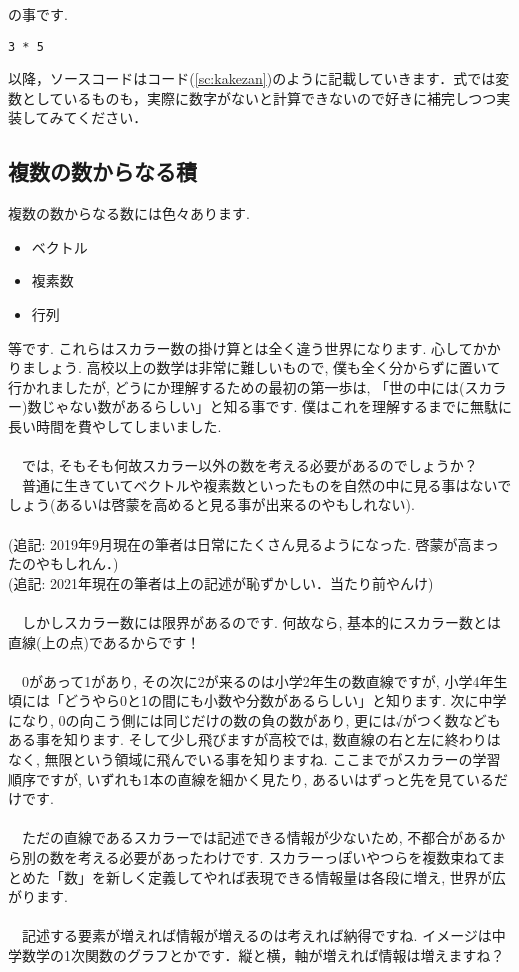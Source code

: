 \documentclass[11pt,a4paper]{ujreport}
\begin{document}
の事です.
\begin{lstlisting}[caption=式(\ref{eq:kakezan})のMATLABコード,label=sc:kakezan]
3 * 5
\end{lstlisting}

以降，ソースコードはコード(\ref{sc:kakezan})のように記載していきます．式では変数としているものも，実際に数字がないと計算できないので好きに補完しつつ実装してみてください．
\subsection{複数の数からなる積}
複数の数からなる数には色々あります.\\
\begin{itemize}
 \item ベクトル
 \item 複素数
 \item 行列
\end{itemize}

等です. これらはスカラー数の掛け算とは全く違う世界になります. 心してかかりましょう. 高校以上の数学は非常に難しいもので, 僕も全く分からずに置いて行かれましたが, どうにか理解するための最初の第一歩は, 「世の中には(スカラー)数じゃない数があるらしい」と知る事です. 僕はこれを理解するまでに無駄に長い時間を費やしてしまいました. \\
\\
　では, そもそも何故スカラー以外の数を考える必要があるのでしょうか？\\
　普通に生きていてベクトルや複素数といったものを自然の中に見る事はないでしょう(あるいは啓蒙を高めると見る事が出来るのやもしれない).\\
\\
(追記: 2019年9月現在の筆者は日常にたくさん見るようになった. 啓蒙が高まったのやもしれん．)\\
(追記: 2021年現在の筆者は上の記述が恥ずかしい．当たり前やんけ)\\
\\
　しかしスカラー数には限界があるのです. 何故なら, 基本的にスカラー数とは直線(上の点)であるからです！ \\
\\
　0があって1があり, その次に2が来るのは小学2年生の数直線ですが, 小学4年生頃には「どうやら0と1の間にも小数や分数があるらしい」と知ります. 次に中学になり, 0の向こう側には同じだけの数の負の数があり, 更には√がつく数などもある事を知ります. そして少し飛びますが高校では, 数直線の右と左に終わりはなく, 無限という領域に飛んでいる事を知りますね. ここまでがスカラーの学習順序ですが, いずれも1本の直線を細かく見たり, あるいはずっと先を見ているだけです. \\
\\
　ただの直線であるスカラーでは記述できる情報が少ないため, 不都合があるから別の数を考える必要があったわけです. スカラーっぽいやつらを複数束ねてまとめた「数」を新しく定義してやれば表現できる情報量は各段に増え, 世界が広がります. \\
\\
　記述する要素が増えれば情報が増えるのは考えれば納得ですね. イメージは中学数学の1次関数のグラフとかです．縦と横，軸が増えれば情報は増えますね？
\\
\end{document}
